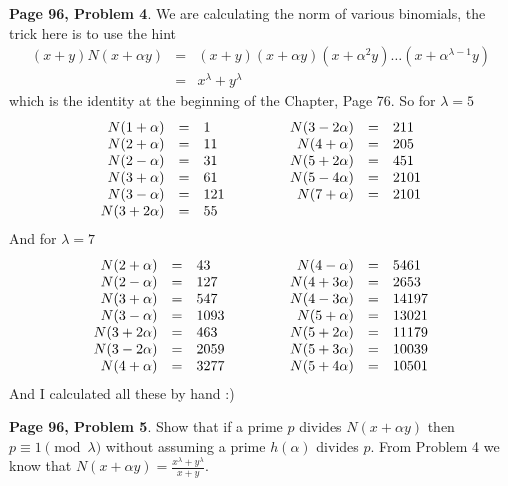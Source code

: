 \documentclass[aps,preprint,preprintnumbers,nofootinbib,showpacs,prd]{revtex4-1}
\newcommand{\nbea}{\begin{eqnarray*}}
\newcommand{\neea}{\end{eqnarray*}}
\begin{document}
{\bf Page 96, Problem 4}. We are calculating the norm of various binomials, the trick here is to use the hint
%
\nbea
(x + y)N(x + \alpha y) & = & (x + y)(x + \alpha y) (x + \alpha^2 y) \dots (x + \alpha^{\lambda-1} y) \\
& = & x^\lambda + y^\lambda
\neea
%
which is the identity at the beginning of the Chapter, Page 76. So for $\lambda = 5$
%
\nbea
\begin{array}{r c l c r c l}
N(1 + \alpha) & = & 1 & ~~~~~~~~ & N(3 -  2\alpha) & = & 211 \\
N(2 + \alpha) & = & 11 & ~~~~~~~~ & N(4 + \alpha) & = & 205 \\
N(2 - \alpha) & = & 31 & ~~~~~~~~ & N(5 + 2\alpha) & = & 451 \\
N(3 + \alpha) & = & 61 & ~~~~~~~~ & N(5 -  4\alpha) & = & 2101 \\
N(3 - \alpha) & = & 121 & ~~~~~~~~ & N(7 + \alpha) & = & 2101 \\
N(3 + 2\alpha) & = & 55 & ~~~~~~~~ & & &
\end{array}
\neea
%
And for $\lambda = 7$
%
\nbea
\begin{array}{r c l c r c l}
N(2 + \alpha) & = & 43 & ~~~~~~~~ & N(4 - \alpha) & = & 5461 \\
N(2 - \alpha) & = & 127 & ~~~~~~~~ & N(4 + 3\alpha) & = & 2653 \\
N(3 + \alpha) & = & 547 & ~~~~~~~~ & N(4 - 3\alpha) & = & 14197 \\
N(3 - \alpha) & = & 1093 & ~~~~~~~~ & N(5 + \alpha) & = & 13021 \\
N(3 + 2\alpha) & = & 463 & ~~~~~~~~ & N(5 + 2\alpha) & = & 11179 \\
N(3 - 2\alpha) & = & 2059 & ~~~~~~~~ & N(5 + 3\alpha) & = & 10039 \\
N(4 + \alpha) & = & 3277 & ~~~~~~~~ & N(5 + 4\alpha) & = & 10501 
\end{array}
\neea
%
And I calculated all these by hand :)

{\bf Page 96, Problem 5}. Show that if a prime $p$ divides $N(x + \alpha y)$ then $p \equiv 1 \pmod{\lambda}$ without assuming a prime $h(\alpha)$ divides $p$. From Problem 4 we know that $N(x + \alpha y) = \frac{x^\lambda + y^\lambda}{x + y}$.
\end{document}
